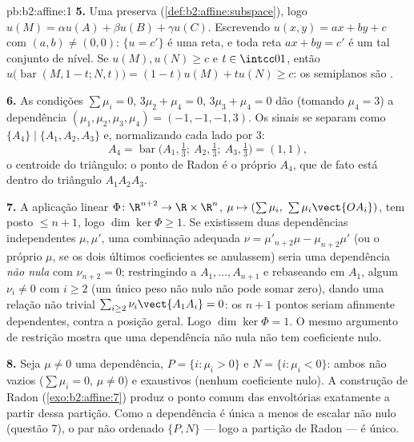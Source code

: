 \begin{solution}{pb:b2:affine:1}
\textbf{5.} Uma  preserva 
(\cref{def:b2:affine:subspace}), logo $u(M) = \alpha u(A) +
\beta u(B) + \gamma u(C)$. Escrevendo $u(x, y) = ax + by + c$
com $(a, b) \neq (0,0)$: $\{u = c'\}$ é uma reta, e toda
reta $ax + by = c'$ é um tal conjunto de nível. Se $u(M), u(N) \geq
c$ e $t \in \intcc01$, então $u\bigl(\operatorname{bar}(M,
1-t; N, t)\bigr) = (1-t)u(M) + tu(N) \geq c$: os semiplanos são
.

\textbf{6.} As condições $\sum\mu_i = 0$, $3\mu_2 + \mu_4 =
0$, $3\mu_3 + \mu_4 = 0$ dão (tomando $\mu_4 = 3$) a
dependência $(\mu_1, \mu_2, \mu_3, \mu_4) = (-1, -1, -1, 3)$.
Os sinais se separam como $\{A_4\} \mid \{A_1, A_2, A_3\}$ e,
normalizando cada lado por $3$:
\[
A_4 = \operatorname{bar}\bigl(A_1, \tfrac13;\ A_2, \tfrac13;\
A_3, \tfrac13\bigr) = (1,1),
\]
o centroide do triângulo: o ponto de Radon é o próprio $A_4$,
que de fato está dentro do triângulo $A_1A_2A_3$.

\textbf{7.} A aplicação linear $\Phi \colon \R^{n+2} \to \R
\times \R^n$, $\mu \mapsto (\sum\mu_i,\
\sum\mu_i\vect{OA_i})$, tem posto $\leq n + 1$, logo $\dim\ker
\Phi \geq 1$. Se existissem duas dependências independentes $\mu, \mu'$,
uma combinação adequada $\nu = \mu'_{n+2}\mu -
\mu_{n+2}\mu'$ (ou o próprio $\mu$, se os dois últimos coeficientes
se anulassem) seria uma dependência \emph{não nula} com $\nu_{n+2}
= 0$; restringindo a $A_1, \dots, A_{n+1}$ e rebaseando em
$A_1$, algum $\nu_i \neq 0$ com $i \geq 2$ (um único peso não nulo
não pode somar zero), dando uma relação não trivial
$\sum_{i\geq2}\nu_i\vect{A_1A_i} = 0$: os $n+1$ pontos seriam
afinmente dependentes, contra a posição geral. Logo $\dim\ker
\Phi = 1$. O mesmo argumento de restrição mostra que uma dependência
não nula não tem coeficiente nulo.

\textbf{8.} Seja $\mu \neq 0$ uma dependência, $P = \{i :
\mu_i > 0\}$ e $N = \{i : \mu_i < 0\}$: ambos não vazios
($\sum\mu_i = 0$, $\mu \neq 0$) e exaustivos (nenhum coeficiente
nulo). A construção de Radon (\cref{exo:b2:affine:7})
produz o ponto comum das envoltórias exatamente a partir dessa partição.
Como a dependência é única a menos de escalar não nulo
(questão 7), o par não ordenado $\{P, N\}$ --- logo a
partição de Radon --- é único.


\end{solution}
